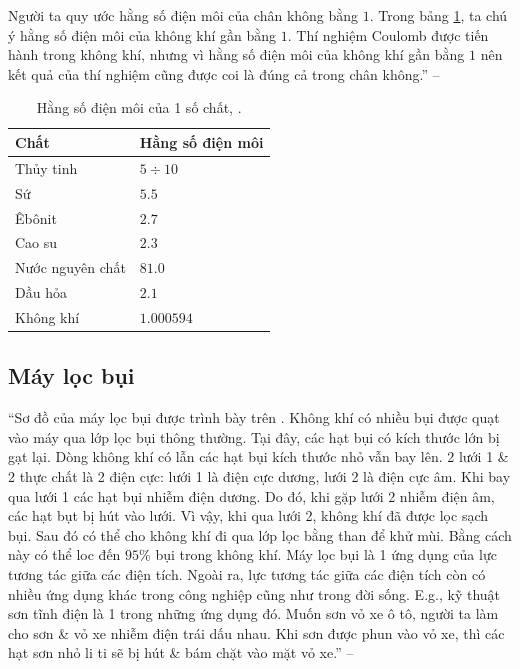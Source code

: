 \documentclass[oneside]{book}
\numberwithin{equation}{section}
\begin{document}
Người ta quy ước hằng số điện môi của chân không bằng $1$. Trong bảng \ref{tab:hang so dien moi}, ta chú ý hằng số điện môi của không khí gần bằng $1$. Thí nghiệm Coulomb được tiến hành trong không khí, nhưng vì hằng số điện môi của không khí gần bằng $1$ nên kết quả của thí nghiệm cũng được coi là đúng cả trong chân không.'' -- \cite[p. 8]{SGK_Vat_Ly_11_nang_cao}

\begin{table}[H]
	\centering
	\begin{tabular}{|l|l|}
		\hline
		\textbf{Chất} & \textbf{Hằng số điện môi} \\
		\hline
		Thủy tinh & $5\div 10$ \\
		\hline
		Sứ & $5.5$ \\
		\hline
		Êbônit & $2.7$ \\
		\hline
		Cao su & $2.3$ \\
		\hline
		Nước nguyên chất & $81.0$ \\
		\hline
		Dầu hỏa & $2.1$ \\
		\hline
		Không khí & $1.000594$ \\
		\hline
	\end{tabular}
	\caption{Hằng số điện môi của 1 số chất, \cite[Bảng 1.1, p. 8]{SGK_Vat_Ly_11_nang_cao}.}
	\label{tab:hang so dien moi}
\end{table}

\subsection{Máy lọc bụi}
``Sơ đồ của máy lọc bụi được trình bày trên \cite[Hình 1.8: \textsf{Sơ đồ máy lọc bụi}, p. 9]{SGK_Vat_Ly_11_nang_cao}. Không khí có nhiều bụi được quạt vào máy qua lớp lọc bụi thông thường. Tại đây, các hạt bụi có kích thước lớn bị gạt lại. Dòng không khí có lẫn các hạt bụi kích thước nhỏ vẫn bay lên. 2 lưới 1 \& 2 thực chất là 2 điện cực: lưới 1 là điện cực dương, lưới 2 là điện cực âm. Khi bay qua lưới 1 các hạt bụi nhiễm điện dương. Do đó, khi gặp lưới 2 nhiễm điện âm, các hạt bụt bị hút vào lưới. Vì vậy, khi qua lưới 2, không khí đã được lọc sạch bụi. Sau đó có thể cho không khí đi qua lớp lọc bằng than để khử mùi. Bằng cách này có thể loc đến $95\%$ bụi trong không khí. Máy lọc bụi là 1 ứng dụng của lực tương tác giữa các điện tích. Ngoài ra, lực tương tác giữa các điện tích còn có nhiều ứng dụng khác trong công nghiệp cũng như trong đời sống. E.g., kỹ thuật sơn tĩnh điện là 1 trong những ứng dụng đó. Muốn sơn vỏ xe ô tô, người ta làm cho sơn \& vỏ xe nhiễm điện trái dấu nhau. Khi sơn được phun vào vỏ xe, thì các hạt sơn nhỏ li ti sẽ bị hút \& bám chặt vào mặt vỏ xe.'' -- \cite[p. 9]{SGK_Vat_Ly_11_nang_cao}
\end{document}

